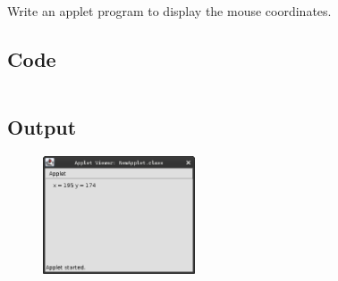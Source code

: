 \documentclass[../main.tex]{subfiles}
\begin{document}
Write an applet program to display the mouse coordinates.

\subsection{Code}
\inputminted[frame=lines, breaklines, breakanywhere, numberblanklines=false]{java}{./programs/prog18/MouseProg.java}

\subsection{Output}
\begin{figure}[h!]
	\centering
	\includegraphics[width=0.4\textwidth]{./assets/p18-s1.png}
\end{figure}
\end{document}
